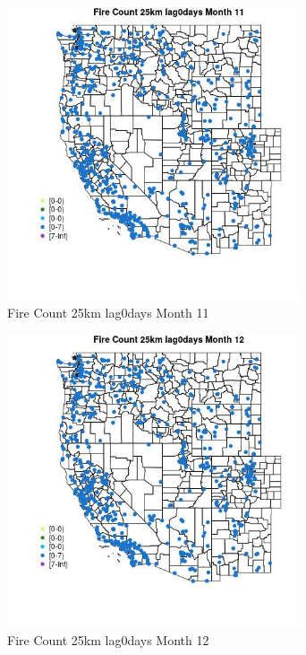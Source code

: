 \begin{figure} 
\centering  
\includegraphics[width=0.77\textwidth]{Code_Outputs/Report_ML_input_PM25_Step4_part_e_de_duplicated_aves_compiled_2019-05-21wNAs_MapObsMo11Fire_Count_25km_lag0days.jpg} 
\caption{\label{fig:Report_ML_input_PM25_Step4_part_e_de_duplicated_aves_compiled_2019-05-21wNAsMapObsMo11Fire_Count_25km_lag0days}Fire Count 25km lag0days Month 11} 
\end{figure} 
 

\begin{figure} 
\centering  
\includegraphics[width=0.77\textwidth]{Code_Outputs/Report_ML_input_PM25_Step4_part_e_de_duplicated_aves_compiled_2019-05-21wNAs_MapObsMo12Fire_Count_25km_lag0days.jpg} 
\caption{\label{fig:Report_ML_input_PM25_Step4_part_e_de_duplicated_aves_compiled_2019-05-21wNAsMapObsMo12Fire_Count_25km_lag0days}Fire Count 25km lag0days Month 12} 
\end{figure} 
 


